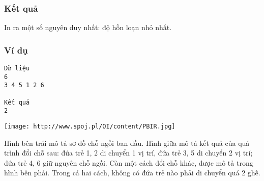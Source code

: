 \subsubsection{   Kết quả  }

   In ra một số nguyên duy nhất: độ hỗn loạn nhỏ nhất.  

\subsubsection{   Ví dụ  }
\begin{verbatim}
Dữ liệu
6
3 4 5 1 2 6

Kết quả
2
\end{verbatim}
\texttt{[image: http://www.spoj.pl/OI/content/PBIR.jpg]}

   Hình bên trái mô tả sơ đồ chỗ ngồi ban đầu. Hình giữa mô tả kết quả của quá trình đổi chỗ sau: đứa trẻ 1, 2 di chuyển 1 vị trí, đứa trẻ 3, 5 di chuyển 2 vị trí; đứa trẻ 4, 6 giữ nguyên chỗ ngồi. Còn một cách đổi chỗ khác, được mô tả trong hình bên phải. Trong cả hai cách, không có đứa trẻ nào phải di chuyển quá 2 ghế.  
